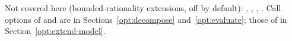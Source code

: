\documentclass[11pt,a4paper]{article}
\begin{document}
Not covered here (bounded-rationality extensions, off by default): ,
, , . Call options of
 and  are in Sections~\ref{opt:decompose}
and~\ref{opt:evaluate}; those of  in Section~\ref{opt:extend-model}.



\end{document}
